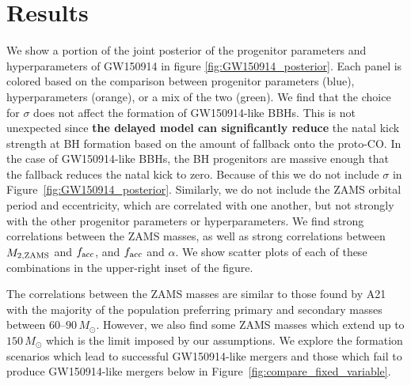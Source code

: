 \documentclass[linenumbers,twocolumn]{aastex631}
\begin{document}
\section{Results}
\label{sec:result}

We show a portion of the joint posterior of the progenitor parameters and
hyperparameters of GW150914 in figure \ref{fig:GW150914_posterior}. Each panel
is colored based on the comparison between progenitor parameters (blue),
hyperparameters (orange), or a mix of the two (green). We find that the choice
for $\sigma$ does not affect the formation of GW150914-like BBHs. This is not
unexpected since \textbf{the \citet{Fryer2012} delayed model can significantly reduce} the
natal kick strength at BH formation based on the amount of fallback onto the
proto-CO. In the case of GW150914-like BBHs, the BH progenitors are massive
enough that the fallback reduces the natal kick to zero. Because of this we do
not include $\sigma$ in Figure~\ref{fig:GW150914_posterior}. Similarly, we do
not include the ZAMS orbital period and eccentricity, which are correlated with
one another, but not strongly with the other progenitor parameters or
hyperparameters. We find strong correlations between the ZAMS masses, as well as
strong correlations between $M_{2,\rm{ZAMS}}$ and $f_{\rm{acc}}$, and
$f_{\rm{acc}}$ and $\alpha$. We show scatter plots of each of these combinations
in the upper-right inset of the figure.

The correlations between the ZAMS masses are similar to those found by A21 with
the majority of the population preferring primary and secondary masses between
$60$--$90\,M_{\odot}$. However, we also find some ZAMS masses which extend up to
$150\,M_{\odot}$ which is the limit imposed by our assumptions. We explore the
formation scenarios which lead to successful GW150914-like mergers and those
which fail to produce GW150914-like mergers below in
Figure~\ref{fig:compare_fixed_variable}.
\end{document}
